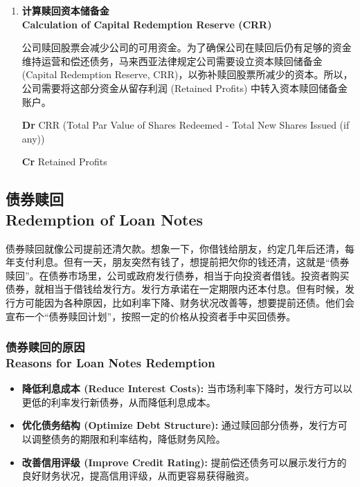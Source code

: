 \documentclass{article}
\begin{document}
\begin{enumerate}
    \item \textbf{计算赎回资本储备金\\Calculation of Capital Redemption Reserve (CRR)}
    
    公司赎回股票会减少公司的可用资金。为了确保公司在赎回后仍有足够的资金维持运营和偿还债务，马来西亚法律规定公司需要设立资本赎回储备金 (Capital Redemption Reserve, CRR)，以弥补赎回股票所减少的资本。所以，公司需要将这部分资金从留存利润 (Retained Profits) 中转入资本赎回储备金账户。

    \begin{mdframed}[backgroundcolor=gray!10]
    \textbf{Dr} CRR (Total Par Value of Shares Redeemed - Total New Shares Issued (if any))

    \hspace{1.7em}\textbf{Cr} Retained Profits
    \end{mdframed}
\end{enumerate}

\newpage

\subsection{债券赎回\\Redemption of Loan Notes}

\noindent 债券赎回就像公司提前还清欠款。想象一下，你借钱给朋友，约定几年后还清，每年支付利息。但有一天，朋友突然有钱了，想提前把欠你的钱还清，这就是“债券赎回”。在债券市场里，公司或政府发行债券，相当于向投资者借钱。投资者购买债券，就相当于借钱给发行方。发行方承诺在一定期限内还本付息。但有时候，发行方可能因为各种原因，比如利率下降、财务状况改善等，想要提前还债。他们会宣布一个“债券赎回计划”，按照一定的价格从投资者手中买回债券。

\subsubsection{债券赎回的原因\\Reasons for Loan Notes Redemption}

\begin{itemize}[labelindent=1cm]
    \item \textbf{降低利息成本 (Reduce Interest Costs):} 当市场利率下降时，发行方可以以更低的利率发行新债券，从而降低利息成本。
    \item \textbf{优化债务结构 (Optimize Debt Structure):} 通过赎回部分债券，发行方可以调整债务的期限和利率结构，降低财务风险。
    \item \textbf{改善信用评级 (Improve Credit Rating):} 提前偿还债务可以展示发行方的良好财务状况，提高信用评级，从而更容易获得融资。
\end{itemize}
\end{document}
